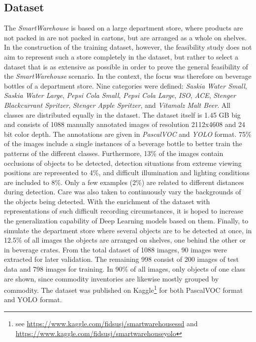 \documentclass[a4paper, 10pt, journal]{wissarbIEEE}      %
\begin{document}
\subsection{Dataset}

The \textit{SmartWarehouse} is based on a large department store, where products are not packed in
are not packed in cartons, but are arranged as a whole on shelves. In the construction of the training dataset, however, the feasibility study does not aim to represent such a store completely in the dataset, but rather to select a dataset that is as extensive as possible in order to prove the general feasibility of the \textit{SmartWarehouse} scenario. In the context, the focus was therefore on beverage bottles of a department store. Nine categories were defined: \textit{Saskia Water Small}, \textit{Saskia Water Large}, \textit{Pepsi Cola Small}, \textit{Pepsi Cola Large}, \textit{ISO}, \textit{ACE}, \textit{Stenger Blackcurrant Spritzer}, \textit{Stenger Apple Spritzer}, and \textit{Vitamalz Malt Beer}. All classes are distributed equally in the dataset. The dataset itself is 1.45 GB big and consists of 1088 manually annotated images of resolution 2112x4608 and 24 bit color depth. The annotations are given in \textit{PascalVOC} and \textit{YOLO} format. 75\% of the images include a single instances of a beverage bottle to better train the patterns of the different classes. Furthermore, 13\% of the images contain occlusions of objects to be detected, detection situations from extreme viewing positions are represented to 4\%, and difficult illumination and lighting conditions are included to 8\%. Only a few examples (2\%) are related to different distances during detection. Care was also taken to continuously vary the backgrounds of the objects being detected. With the enrichment of the dataset with representations of such difficult recording circumstances, it is hoped to increase the generalization capability of Deep Learning models based on them. Finally, to simulate the department store where several objects are to be detected at once, in 12.5\% of all images the objects are arranged on shelves, one behind the other or in beverage crates. From the total dataset of 1088 images, 90 images were extracted for later validation. The remaining 998 consist of 200 images of test data and 798 images for training. In 90\% of all images, only objects of one class are shown, since commodity inventories are likewise mostly grouped by commodity. The dataset was published on Kaggle\footnote{see \url{https://www.kaggle.com/fidsusj/smartwarehousessd} and \url{https://www.kaggle.com/fidsusj/smartwarehouseyolo}} for both PascalVOC format and YOLO format.
\end{document}

